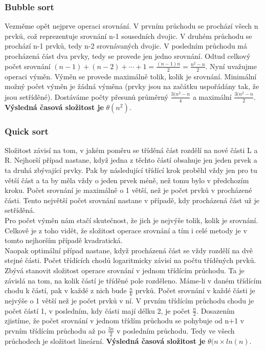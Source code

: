 \documentclass[10pt,a4paper]{article}
\begin{document}
\subsubsection{Bubble sort}
Vezměme opět nejprve operaci srovnání. V prvním průchodu se prochází všech n prvků, což reprezentuje srovnání n-1 sousedních dvojic. V druhém průchodu se prochází n-1 prvků, tedy n-2 srovnávaných dvojic. V posledním průchodu má procházená část dva prvky, tedy se provede jen jedno srovnání. Odtud celkový počet srovnání $(n-1) + (n-2) + \cdots + 1 = \frac{(n-1)n}{2} = \frac{n^2-n}{2}$. Nyní uvažujme operaci výměn. Výměn se provede maximálně tolik, kolik je srovnání. Minimální možný počet výměn je žádná výměna (prvky jsou na začátku uspořádány tak, že jsou setříděné). Dostáváme počty přesunů průměrný $\frac{3(n^2-n}{4}$ a maximální $\frac{3(n^2-n}{2}$. \textbf{Výsledná časová složitost je} $\theta (n^2)$.

\subsubsection{Quick sort}
Složitost závisí na tom, v jakém poměru se tříděná část rozdělí na nové části L a R. Nejhorší případ nastane, když jedna z těchto částí obsahuje jen jeden prvek a ta druhá zbývající prvky. Pak by následující třídící krok proběhl vždy jen pro tu větší část a ta by měla vždy o jeden prvek méně, než tomu bylo v předchozím kroku. Počet srovnání je maximálně o 1 větší, než je počet prvků v procházené části. Tento největší počet srovnání nastane v případě, kdy procházená část už je setříděná. \\
Pro počet výměn nám stačí skutečnost, že jich je nejvýše tolik, kolik je srovnání. Celkově je z toho vidět, že složitost operace srovnání a tím i celé metody je v tomto nejhorším případě kvadratická. \\
Naopak optimální případ nastane, když procházená část se vždy rozdělí na dvě stejné části. Počet třídících chodů logaritmicky závisí na počtu tříděných prvků. Zbývá stanovit složitost operace srovnání v jednom třídícím průchodu. Ta je závislá na tom, na kolik částí je tříděné pole rozděleno. Máme-li v daném třídícím chodu k částí, pak v každé z nich bude $\frac{n}{k}$ prvků. Počet srovnání v každé části je nejvýše o 1 větší než je počet prvků v ní. V prvním třídícím průchodu chodu je počet částí 1, v posledním, kdy části mají délku 2, je počet $\frac{n}{2}$. Dosazením zjistíme, že počet srovnání v jednom třídím průchodu se pohybuje od n+1 v prvním třídícím průchodu až po $\frac{3n}{2}$ v posledním průchodu. Tedy ve všech průchodech je složitost lineární. \textbf{Výsledná časová složitost je} $\theta (n \times ln(n)$.
\end{document}
